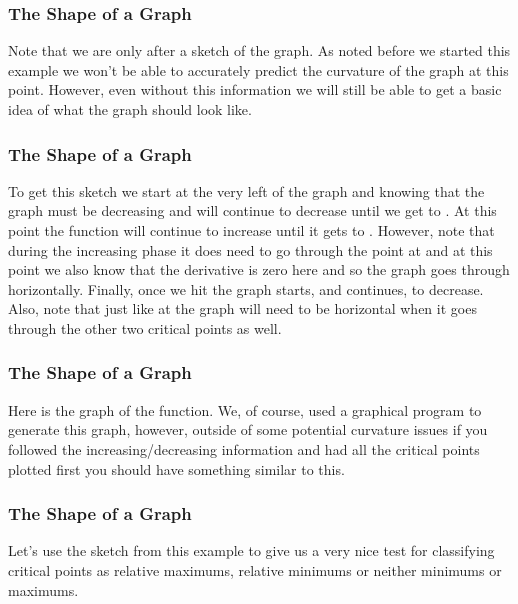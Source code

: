 \documentclass{beamer}
\begin{document}
\begin{frame} 
	\frametitle{The Shape of a Graph}
Note that we are only after a sketch of the graph.  As noted before we started this example we won’t be able to accurately predict the curvature of the graph at this point.  However, even without this information we will still be able to get a basic idea of what the graph should look like.
\end{frame}
\begin{frame} 
	\frametitle{The Shape of a Graph}
To get this sketch we start at the very left of the graph and knowing that the graph must be decreasing and will continue to decrease until we get to .  At this point the function will continue to increase until it gets to .  However, note that during the increasing phase it does need to go through the point at  and at this point we also know that the derivative is zero here and so the graph goes through  horizontally.  Finally, once we hit  the graph starts, and continues, to decrease.   Also, note that just like at  the graph will need to be horizontal when it goes through the other two critical points as well.
\end{frame}
\begin{frame} 
	\frametitle{The Shape of a Graph}
Here is the graph of the function.  We, of course, used a graphical program to generate this graph, however, outside of some potential curvature issues if you followed the increasing/decreasing information and had all the critical points plotted first you should have something similar to this.

\end{frame}
\begin{frame} 
	\frametitle{The Shape of a Graph}
	Let’s use the sketch from this example to give us a very nice test for classifying critical points as relative maximums, relative minimums or neither minimums or maximums.
\end{frame}
\end{document}
